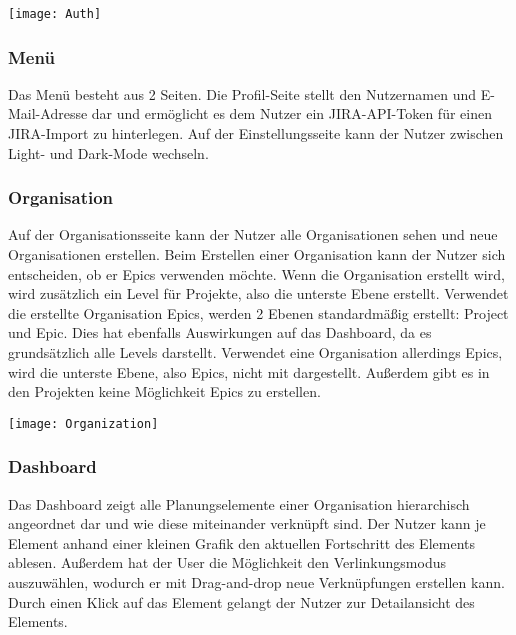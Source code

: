 \vspace{20pt}
\begin{center}
    \begin{minipage}{\linewidth}
        \texttt{[image: Auth]}
    \end{minipage}
\end{center}
\vspace{20pt}

\subsubsection{Menü}
Das Menü besteht aus 2 Seiten. Die Profil-Seite stellt den Nutzernamen und E-Mail-Adresse dar und ermöglicht es dem Nutzer ein JIRA-API-Token für einen JIRA-Import zu hinterlegen. Auf der Einstellungsseite kann der Nutzer zwischen Light- und Dark-Mode wechseln.

\subsubsection{Organisation}
Auf der Organisationsseite kann der Nutzer alle Organisationen sehen und neue Organisationen erstellen. Beim Erstellen einer Organisation kann der Nutzer sich entscheiden, ob er Epics verwenden möchte. Wenn die Organisation erstellt wird, wird zusätzlich ein Level für Projekte, also die unterste Ebene erstellt. Verwendet die erstellte Organisation Epics, werden 2 Ebenen standardmäßig erstellt: Project und Epic. Dies hat ebenfalls Auswirkungen auf das Dashboard, da es grundsätzlich alle Levels darstellt. Verwendet eine Organisation allerdings Epics, wird die unterste Ebene, also Epics, nicht mit dargestellt. Außerdem gibt es in den Projekten keine Möglichkeit Epics zu erstellen.

\vspace{20pt}
\begin{center}
    \begin{minipage}{\linewidth}
        \texttt{[image: Organization]}
    \end{minipage}
\end{center}
\vspace{20pt}


\subsubsection{Dashboard}
Das Dashboard zeigt alle Planungselemente einer Organisation hierarchisch angeordnet dar und wie diese miteinander verknüpft sind. Der Nutzer kann je Element anhand einer kleinen Grafik den aktuellen Fortschritt des Elements ablesen. Außerdem hat der User die Möglichkeit den Verlinkungsmodus auszuwählen, wodurch er mit Drag-and-drop neue Verknüpfungen erstellen kann. Durch einen Klick auf das Element gelangt der Nutzer zur Detailansicht des Elements.


